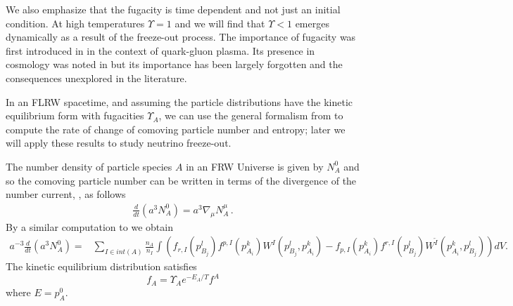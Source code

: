 We also emphasize that the fugacity is time dependent and not just an initial condition. At high temperatures $\Upsilon=1$ and we will find that $\Upsilon<1$ emerges dynamically as a result of the freeze-out process. The importance of fugacity was first introduced in \cite{Rafelski:1982pu} in the context of quark-gluon plasma. Its presence in cosmology was noted in \cite{Bernstein:1985th,Dolgov:1992wf} but its importance has been largely forgotten and the consequences unexplored in the literature. 

In an FLRW spacetime, and assuming the particle distributions have the kinetic equilibrium form  with fugacities $\Upsilon_{A}$, we can use the general formalism from  to compute the rate of change of comoving particle number and entropy; later we will apply these results to study neutrino freeze-out.

The number density of particle species $A$ in an FRW Universe is given by $N_A^0$ and so the comoving particle number can be written in terms of the divergence of the number current, , as follows
\begin{align}
\frac{d}{dt}(a^3N^0_A)=a^{3} \nabla_\mu N_A^\mu\,. 
\end{align}
By a similar computation to  we obtain
\begin{align}\label{eq:FRWcomovingNumGen}
a^{-3}\frac{d}{dt}(a^3N^0_A)=&\sum_{I\in int(A)} \frac{n_A}{n_I}\int\left(f_{r,I}(p_{B_j}^l)f^{p,I}(p_{A_i}^k)W^I(p_{B_j}^l,p_{A_i}^k) 
-f_{p,I}(p_{A_i}^k)f^{r,I}(p_{B_j}^l)W^{\overleftarrow{I}}(p_{A_i}^k,p_{B_j}^l)\right) dV.
\end{align}
The kinetic equilibrium distribution satisfies
\begin{equation}
f_A=\Upsilon_A e^{-E_A/T}f^A
\end{equation}
where $E=p_A^0$. 

